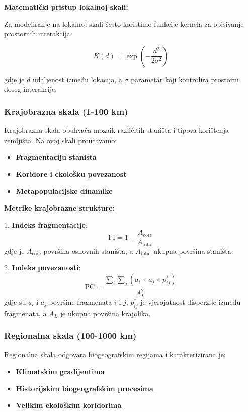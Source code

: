 \documentclass[11pt,oneside]{book}
\begin{document}
\textbf{Matematički pristup lokalnoj skali:}

Za modeliranje na lokalnoj skali često koristimo funkcije kernela za opisivanje prostornih interakcija:

\begin{equation}
	K(d) = \exp\left(-\frac{d^2}{2\sigma^2}\right)
\end{equation}

gdje je $d$ udaljenost između lokacija, a $\sigma$ parametar koji kontrolira prostorni doseg interakcije.

\subsubsection{Krajobrazna skala (1-100 km)}

Krajobrazna skala obuhvaća mozaik različitih staništa i tipova korištenja zemljišta. Na ovoj skali proučavamo:

\begin{itemize}
	\item \textbf{Fragmentaciju staništa}
	\item \textbf{Koridore i ekološku povezanost}
	\item \textbf{Metapopulacijske dinamike}
\end{itemize}

\textbf{Metrike krajobrazne strukture:}

1. \textbf{Indeks fragmentacije}:
\begin{equation}
	\text{FI} = 1 - \frac{A_{\text{core}}}{A_{\text{total}}}
\end{equation}
gdje je $A_{\text{core}}$ površina osnovnih staništa, a $A_{\text{total}}$ ukupna površina staništa.

2. \textbf{Indeks povezanosti}:
\begin{equation}
	\text{PC} = \frac{\sum_i \sum_j (a_i \times a_j \times p^*_{ij})}{A^2_L}
\end{equation}
gdje su $a_i$ i $a_j$ površine fragmenata $i$ i $j$, $p^*_{ij}$ je vjerojatnost disperzije između fragmenata, a $A_L$ je ukupna površina krajolika.

\subsubsection{Regionalna skala (100-1000 km)}

Regionalna skala odgovara biogeografskim regijama i karakterizirana je:

\begin{itemize}
	\item \textbf{Klimatskim gradijentima}
	\item \textbf{Historijskim biogeografskim procesima}
	\item \textbf{Velikim ekološkim koridorima}
\end{itemize}
\end{document}
